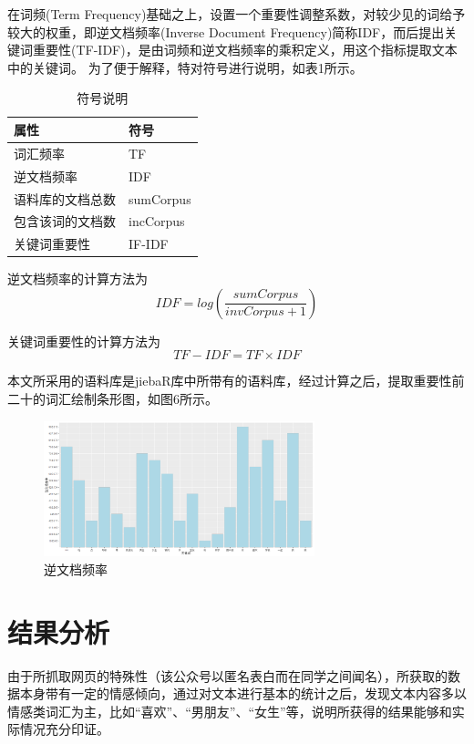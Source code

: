 \documentclass[a4paper,12pt]{ctexart}     %
\begin{document}
	在词频(Term Frequency)基础之上，设置一个重要性调整系数，对较少见的词给予较大的权重，即逆文档频率(Inverse Document Frequency)简称IDF，而后提出关键词重要性(TF-IDF)，是由词频和逆文档频率的乘积定义，用这个指标提取文本中的关键词。
	为了便于解释，特对符号进行说明，如表1所示。
		\begin{table}[htbp]   
		
			\begin{center}
				\begin{tabular}{ll}   
					\toprule    
					属性 & 符号  \\    
					\midrule 
					词汇频率 & TF \\  
					逆文档频率 & IDF  \\   
					语料库的文档总数 & sumCorpus  \\   
					包含该词的文档数 & incCorpus  \\
					关键词重要性 & IF-IDF\\  
					\bottomrule   
					
				\end{tabular} 
				\caption{\label{tab:test}符号说明} 
			\end{center}
		\end{table}
	
逆文档频率的计算方法为
$$
IDF = log(\frac{sumCorpus}{invCorpus+1})
$$
\par
关键词重要性的计算方法为
$$
TF-IDF = TF \times IDF
$$
\par
本文所采用的语料库是jiebaR库中所带有的语料库，经过计算之后，提取重要性前二十的词汇绘制条形图，如图6所示。
	
\par	
		\begin{figure}[H] %
			\centering %
			\includegraphics[width=0.7\textwidth]{逆文档频率.png} %
			\caption{逆文档频率} %
		\end{figure}

	


	\section{结果分析}
	由于所抓取网页的特殊性（该公众号以匿名表白而在同学之间闻名），所获取的数据本身带有一定的情感倾向，通过对文本进行基本的统计之后，发现文本内容多以情感类词汇为主，比如“喜欢”、“男朋友”、“女生”等，说明所获得的结果能够和实际情况充分印证。
	
\end{document}
